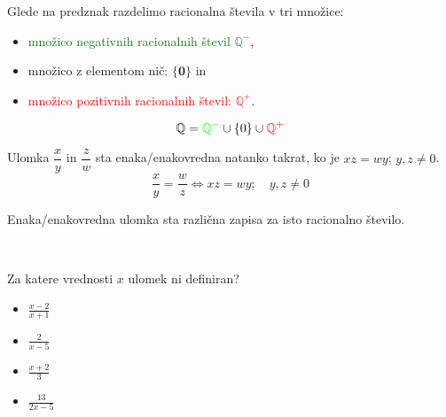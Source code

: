            

            
                Glede na predznak razdelimo racionalna števila v tri množice:
                \begin{itemize}
                    \item \textcolor{green}{množico negativnih racionalnih števil $\mathbf{\mathbb{Q}^-}$},
                    \item množico z elementom nič: $\mathbf{\{0\}}$ in
                    \item \textcolor{red}{množico pozitivnih racionalnih števil: $\mathbf{\mathbb{Q}^+}$}.
                \end{itemize}
                $$ \mathbb{Q}=\textcolor{green}{\mathbb{Q}^-}\cup\{0\}\cup\textcolor{red}{\mathbb{Q}^+} $$
            
            


        

        
            
                Ulomka $\dfrac{x}{y}$ in $\dfrac{z}{w}$ sta enaka/enakovredna natanko takrat, ko je $xz=wy$; $y,z\neq 0$.
                $$\dfrac{x}{y}=\dfrac{w}{z}\Leftrightarrow xz=wy; \quad y,z\neq 0$$
            

            
                Enaka/enakovredna ulomka sta različna zapisa za isto racionalno število.
            
        ~\\




        
            \begin{naloga}
                Za katere vrednosti $x$ ulomek ni definiran?
                \begin{itemize}
                    \item $\frac{x-2}{x+1}$ 
                    \item $\frac{2}{x-5}$ 
                    \item $\frac{x+2}{3}$ 
                    \item $\frac{13}{2x-5}$ 
                \end{itemize}
            \end{naloga}
        

